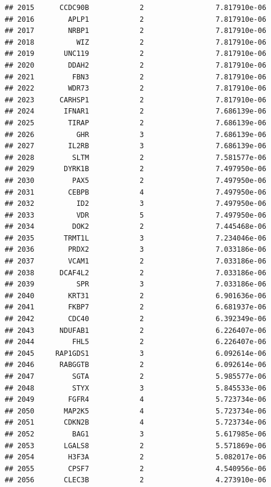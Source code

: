 \documentclass[
]{article}
\begin{document}
\begin{verbatim}
## 2015      CCDC90B            2                 7.817910e-06
## 2016        APLP1            2                 7.817910e-06
## 2017        NRBP1            2                 7.817910e-06
## 2018          WIZ            2                 7.817910e-06
## 2019       UNC119            2                 7.817910e-06
## 2020        DDAH2            2                 7.817910e-06
## 2021         FBN3            2                 7.817910e-06
## 2022        WDR73            2                 7.817910e-06
## 2023      CARHSP1            2                 7.817910e-06
## 2024       IFNAR1            2                 7.686139e-06
## 2025        TIRAP            2                 7.686139e-06
## 2026          GHR            3                 7.686139e-06
## 2027        IL2RB            3                 7.686139e-06
## 2028         SLTM            2                 7.581577e-06
## 2029       DYRK1B            2                 7.497950e-06
## 2030         PAX5            2                 7.497950e-06
## 2031        CEBPB            4                 7.497950e-06
## 2032          ID2            3                 7.497950e-06
## 2033          VDR            5                 7.497950e-06
## 2034         DOK2            2                 7.445468e-06
## 2035       TRMT1L            3                 7.234046e-06
## 2036        PRDX2            3                 7.033186e-06
## 2037        VCAM1            2                 7.033186e-06
## 2038      DCAF4L2            2                 7.033186e-06
## 2039          SPR            3                 7.033186e-06
## 2040        KRT31            2                 6.901636e-06
## 2041        FKBP7            2                 6.681937e-06
## 2042        CDC40            2                 6.392349e-06
## 2043      NDUFAB1            2                 6.226407e-06
## 2044         FHL5            2                 6.226407e-06
## 2045     RAP1GDS1            3                 6.092614e-06
## 2046      RABGGTB            2                 6.092614e-06
## 2047         SGTA            2                 5.985577e-06
## 2048         STYX            3                 5.845533e-06
## 2049        FGFR4            4                 5.723734e-06
## 2050       MAP2K5            4                 5.723734e-06
## 2051       CDKN2B            4                 5.723734e-06
## 2052         BAG1            3                 5.617985e-06
## 2053       LGALS8            2                 5.571869e-06
## 2054        H3F3A            2                 5.082017e-06
## 2055        CPSF7            2                 4.540956e-06
## 2056       CLEC3B            2                 4.273910e-06

\end{verbatim}
\end{document}
